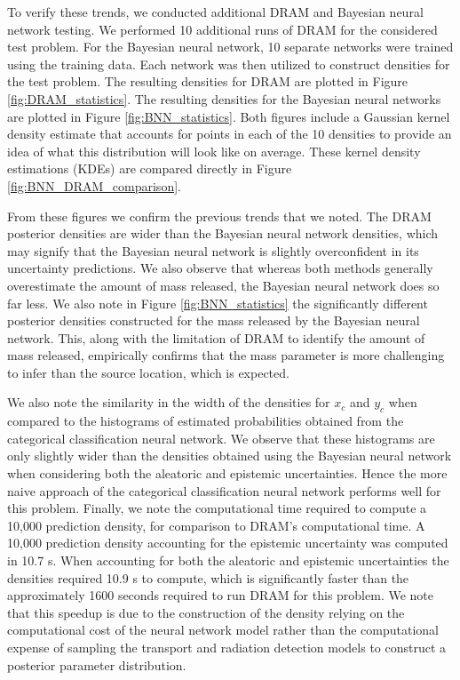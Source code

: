 \documentclass[sn-mathphys-ay]{sn-jnl}
\begin{document}
  To verify these trends, we conducted additional DRAM and Bayesian neural network testing. We performed 10 additional runs of DRAM for the considered test problem. For the Bayesian neural network, 10 separate networks were trained using the training data. Each network was then utilized to construct densities for the test problem. The resulting densities for DRAM are plotted in Figure \ref{fig:DRAM_statistics}. The resulting densities for the Bayesian neural networks are plotted in Figure \ref{fig:BNN_statistics}. Both figures include a Gaussian kernel density estimate that accounts for points in each of the 10 densities to provide an idea of what this distribution will look like on average. These kernel density estimations (KDEs) are compared directly in Figure \ref{fig:BNN_DRAM_comparison}. 
  
  From these figures we confirm the previous trends that we noted. The DRAM posterior densities are wider than the Bayesian neural network densities, which may signify that the Bayesian neural network is slightly overconfident in its uncertainty predictions. We also observe that whereas both methods generally overestimate the amount of mass released, the Bayesian neural network does so far less. We also note in Figure \ref{fig:BNN_statistics} the significantly different posterior densities constructed for the mass released by the Bayesian neural network. This, along with the limitation of DRAM to identify the amount of mass released, empirically confirms that the mass parameter is more challenging to infer than the source location, which is expected.
  
 We also note the similarity in the width of the densities for $x_c$ and $y_c$ when compared to the histograms of estimated probabilities obtained from the categorical classification neural network. We observe that these histograms are only slightly wider than the densities obtained using the Bayesian neural network when considering both the aleatoric and epistemic uncertainties. Hence the more naive approach of the categorical classification neural network performs well for this problem. Finally, we note the computational time required to compute a 10{,}000 prediction density, for comparison to DRAM's computational time. A 10{,}000 prediction density accounting for the epistemic uncertainty was computed in 10.7 s. When accounting for both the aleatoric and epistemic uncertainties the densities required 10.9 s to compute, which is significantly faster than the approximately 1600 seconds required to run DRAM for this problem. We note that this speedup is due to the construction of the density relying on the computational cost of the neural network model rather than the computational expense of sampling the transport and radiation detection models to construct a posterior parameter distribution.
 
\end{document}
